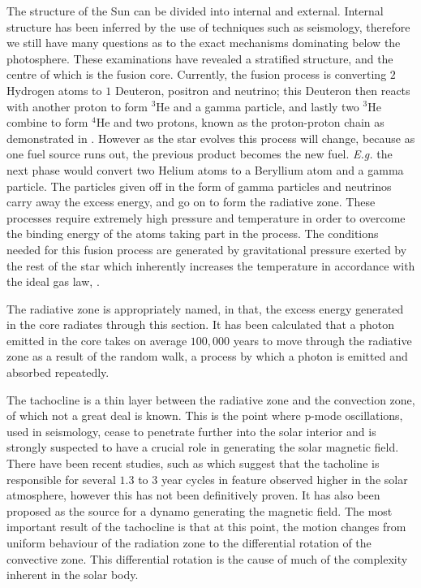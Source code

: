 The structure of the Sun can be divided into internal and external.
Internal structure has been inferred by the use of techniques such as seismology, therefore we still have many questions as to the exact mechanisms dominating below the photosphere.
These examinations have revealed a stratified structure, and the centre of which is the fusion core.
Currently, the fusion process is converting $2$ Hydrogen atoms to $1$ Deuteron, positron and neutrino; this Deuteron then reacts with another proton to form ${^3}$He and a gamma particle, and lastly two $^{3}$He combine to form $^{4}$He and two protons, known as the proton-proton chain as demonstrated in \cite{Bethe1939}. 
However as the star evolves this process will change, because as one fuel source runs out, the previous product becomes the new fuel.
\emph{E.g.} the next phase would convert two Helium atoms to a Beryllium atom and a gamma particle.
The particles given off in the form of gamma particles and neutrinos carry away the excess energy, and go on to form the radiative zone.
These processes require extremely high pressure and temperature in order to overcome the binding energy of the atoms taking part in the process.
The conditions needed for this fusion process are generated by gravitational pressure exerted by the rest of the star which inherently increases the temperature in accordance with the ideal gas law, \citep{Larson2003}.

The radiative zone is appropriately named, in that, the excess energy generated in the core radiates through this section.
It has been calculated that a photon emitted in the core takes on average $100,000$ years to move through the radiative zone as a result of the random walk, a process by which a photon is emitted and absorbed repeatedly.

The tachocline is a thin layer between the radiative zone and the convection zone, of which not a great deal is known.
This is the point where p-mode oscillations, used in seismology, cease to penetrate further into the solar interior and is strongly suspected to have a crucial role in generating the solar magnetic field.
There have been recent studies, such as \cite{Obridko2007} which suggest that the tacholine is responsible for several $1.3$ to $3$ year cycles in feature observed higher in the solar atmosphere, however this has not been definitively proven.
It has also been proposed as the source for a dynamo generating the magnetic field.
The most important result of the tachocline is that at this point, the motion changes from uniform behaviour of the radiation zone to the differential rotation of the convective zone.
This differential rotation is the cause of much of the complexity inherent in the solar body.


